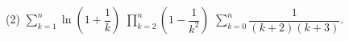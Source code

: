 %
%
\begin{tasks} (2)
	\task $\sum_{k=1}^n \ln\left(1+\dfrac {1}{k}\right)$
	\task $\prod_{k=2}^n \left(1-\dfrac{1}{k^2}\right)$
	\task $\sum_{k=0}^n \dfrac{1}{(k+2)(k+3)}$.
\end{tasks}
